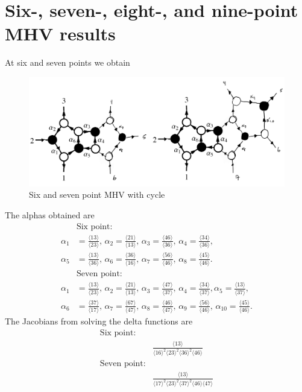 \documentclass[letter,11pt]{article}
\newcommand{\ab}[1]{\langle #1 \rangle}
\begin{document}
\section{Six-, seven-, eight-, and nine-point MHV results} 
At six and seven points we obtain
\begin{figure}[H]
	\centering
	\includegraphics[width=0.7\linewidth]{6+7pt}
	\caption{Six and seven point MHV with cycle}
	\label{fig:two-loop}
\end{figure}
\noindent
The alphas obtained are
\begin{equation}
	\begin{aligned}
		&\text{Six point}:\\
		\alpha_1&=\frac{\ab{13}}{\ab{23}},\,\alpha_2=\frac{\ab{21}}{\ab{13}},\,\alpha_3=\frac{\ab{46}}{\ab{36}},\,\alpha_4=\frac{\ab{34}}{\ab{36}},\\
		\alpha_5&=\frac{\ab{13}}{\ab{36}},\,\alpha_6=\frac{\ab{36}}{\ab{16}},\,\alpha_7=\frac{\ab{56}}{\ab{46}},\,\alpha_8=\frac{\ab{45}}{\ab{46}}.\\
&\text{Seven point}:\\
		\alpha_1&=\frac{\ab{13}}{\ab{23}},\,\alpha_2=\frac{\ab{21}}{\ab{13}},\,\alpha_3=\frac{\ab{47}}{\ab{37}},\,\alpha_4=\frac{\ab{34}}{\ab{37}},\alpha_5=\frac{\ab{13}}{\ab{37}},\\
		\alpha_6&=\frac{\ab{37}}{\ab{17}},\,\alpha_7=\frac{\ab{67}}{\ab{47}},\,\alpha_8=\frac{\ab{46}}{\ab{47}},\,\alpha_9=\frac{\ab{56}}{\ab{46}},\,\alpha_{10}=\frac{\ab{45}}{\ab{46}}.
	\end{aligned}
\end{equation}
The Jacobians from solving the delta functions are
\begin{equation}
	\begin{aligned}
		\text{Six point}:&\\
		&\frac{\ab{13}}{\ab{16}^2\ab{23}^2\ab{36}^2\ab{46}}\\
		\text{Seven point}:&\\
		&\frac{\ab{13}}{\ab{17}^2\ab{23}^2\ab{37}^2\ab{46}\ab{47}}
		\end{aligned}
\end{equation}
\end{document}
